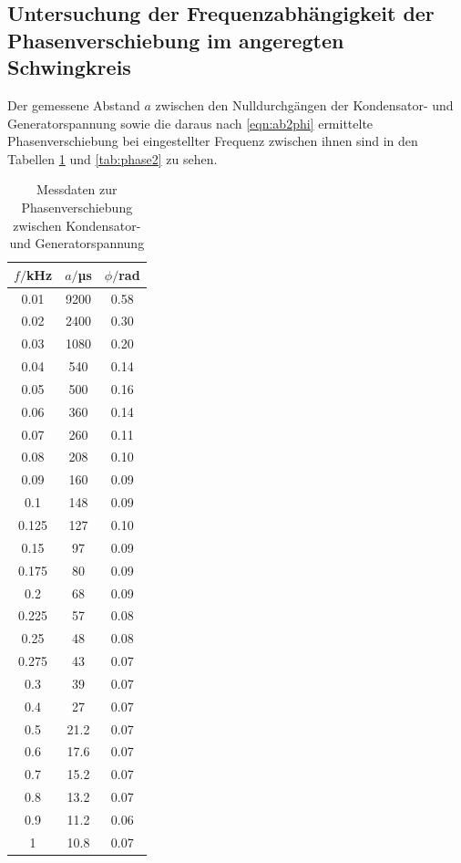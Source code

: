 \subsection{Untersuchung der Frequenzabhängigkeit der Phasenverschiebung im angeregten Schwingkreis}

Der gemessene Abstand $a$ zwischen den Nulldurchgängen der Kondensator- und Generatorspannung
sowie die daraus nach \eqref{eqn:ab2phi} ermittelte Phasenverschiebung bei eingestellter Frequenz zwischen ihnen sind
in den Tabellen \ref{tab:phase1} und \ref{tab:phase2} zu sehen.

\begin{table}
\centering
\caption{Messdaten zur Phasenverschiebung zwischen Kondensator- und Generatorspannung}
\label{tab:phase1}
\begin{tabular}{c c c}
\toprule
$f/$kHz & $a/$µs & $\phi/$rad \\
\midrule
 0.01	 & 9200    & 0.58 \\
 0.02	 & 2400    & 0.30 \\
 0.03	 & 1080    & 0.20 \\
 0.04	 &  540    & 0.14 \\
 0.05	 &  500    & 0.16 \\
 0.06	 &  360    & 0.14 \\
 0.07	 &  260    & 0.11 \\
 0.08	 &  208    & 0.10 \\
 0.09	 &  160    & 0.09 \\
 0.1	 &  148    & 0.09 \\
 0.125 &  127    & 0.10 \\
 0.15	 &   97    & 0.09 \\
 0.175 &   80    & 0.09 \\
 0.2	 &   68    & 0.09 \\
 0.225 &   57    & 0.08 \\
 0.25	 &   48    & 0.08 \\
 0.275 &   43    & 0.07 \\
 0.3	 &   39    & 0.07 \\
 0.4	 &   27    & 0.07 \\
 0.5	 &   21.2  & 0.07 \\
 0.6	 &   17.6  & 0.07 \\
 0.7	 &   15.2  & 0.07 \\
 0.8	 &   13.2  & 0.07 \\
 0.9	 &   11.2  & 0.06 \\
 1	   &   10.8  & 0.07 \\

\end{tabular}
\end{table}
